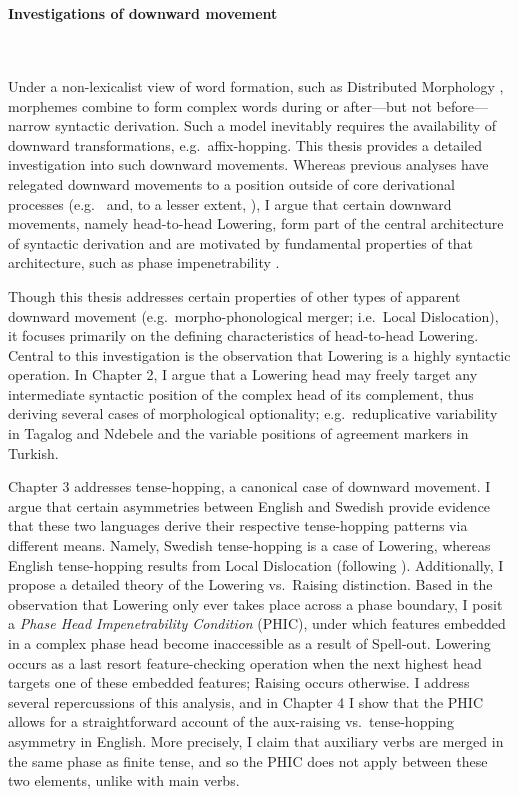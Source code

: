 \setcounter{footnote}{0}
\setcounter{section}{0}
\setcounter{ExNo}{0}
\section*{}
\singlespacing
\begin{center}
\textbf{Investigations of downward movement}
\end{center}
\mbox{}\\\\
Under a non-lexicalist view of word formation, such as Distributed Morphology \citep{halle_marantz1993}, morphemes combine to form complex words during or after---but not before---narrow syntactic derivation. Such a model inevitably requires the availability of downward transformations, e.g.\ affix-hopping. This thesis provides a detailed investigation into such downward movements. Whereas previous analyses have relegated downward movements to a position outside of core derivational processes (e.g.\  and, to a lesser extent, ), I argue that certain downward movements, namely head-to-head Lowering, form part of the central architecture of syntactic derivation and are motivated by fundamental properties of that architecture, such as phase impenetrability \citep{chomsky2001}.

Though this thesis addresses certain properties of other types of apparent downward movement (e.g.\ morpho-phonological merger; i.e.\ Local Dislocation), it focuses primarily on the defining characteristics of head-to-head Lowering. Central to this investigation is the observation that Lowering is a highly syntactic operation. In Chapter 2, I argue that a Lowering head may freely target any intermediate syntactic position of the complex head of its complement, thus deriving several cases of morphological optionality; e.g.\ reduplicative variability in Tagalog and Ndebele and the variable positions of agreement markers in Turkish.

Chapter 3 addresses tense-hopping, a canonical case of downward movement. I argue that certain asymmetries between English and Swedish provide evidence that these two languages derive their respective tense-hopping patterns via different means. Namely, Swedish tense-hopping is a case of Lowering, whereas English tense-hopping results from Local Dislocation (following ). Additionally, I propose a detailed theory of the Lowering vs.\ Raising distinction. Based in the observation that Lowering only ever takes place across a phase boundary, I posit a {\it Phase Head Impenetrability Condition} (PHIC), under which features embedded in a complex phase head become inaccessible as a result of Spell-out. Lowering occurs as a last resort feature-checking operation when the next highest head targets one of these embedded features; Raising occurs otherwise. I address several repercussions of this analysis, and in Chapter 4 I show that the PHIC allows for a straightforward account of the aux-raising vs.\ tense-hopping asymmetry in English. More precisely, I claim that auxiliary verbs are merged in the same phase as finite tense, and so the PHIC does not apply between these two elements, unlike with main verbs.

